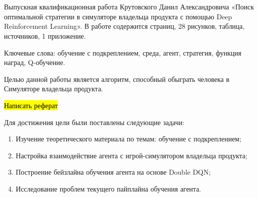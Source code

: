 \documentclass{article}
\begin{document}

\setcounter{page}{2}

\def\oldbibitem{} 
\let\oldbibitem=\bibitem
\def\bibitem{\stepcounter{citnum}\oldbibitem}

\section*{}
Выпускная квалификационная работа Крутовского Данил Александровича «Поиск оптимальной стратегии в симуляторе владельца продукта с помощью Deep Reinforcement Learning». В работе содержится \pageref{LastPage} страниц, 28 рисунков,  таблица,  источников, 1 приложение.

Ключевые слова: обучение с подкреплением, среда, агент, стратегия, функция наград, Q-обучение.

Целью данной работы является алгоритм, способный обыграть человека в Симуляторе владельца продукта.

\hl{Написать реферат}

Для достижения цели были поставлены следующие задачи:
\begin{enumerate}
  \item Изучение теоретического материала по темам: обучение с подкреплением;
  \item Настройка взаимодействие агента с игрой-симулятором владельца продукта;
  \item Построение бейзлайна обучения агента на основе Double DQN;
  \item Исследование проблем текущего пайплайна обучения агента.
\end{enumerate}

\newpage

\let\mtcontentsname\contentsname
\renewcommand\contentsname{\centering\MakeUppercase\mtcontentsname}
\tableofcontents
\newpage

\section*{}
\end{document}

